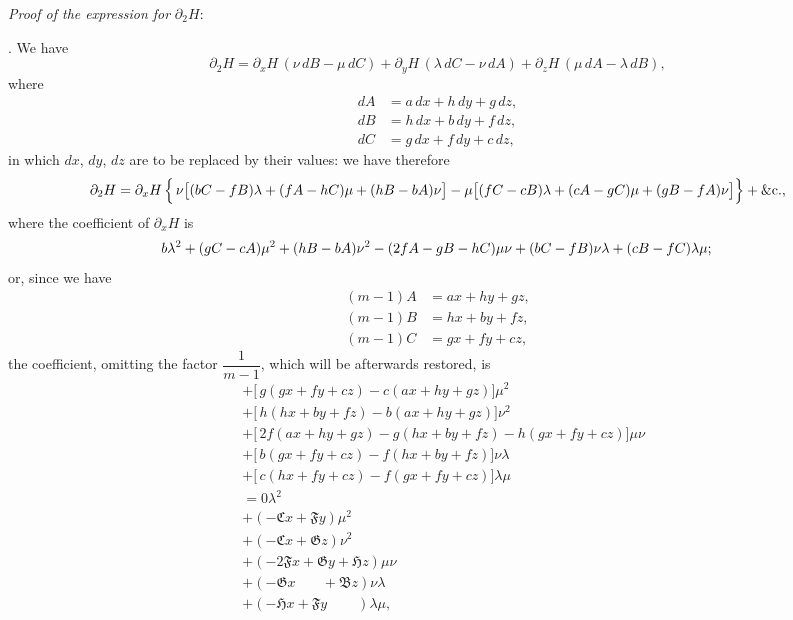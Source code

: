 \documentclass[11pt]{article}
\begin{document}
\medskip

\noindent\textit{Proof of the expression for} $\partial_2 H$:

\medskip

. We have
\[
\partial_2 H = \partial_x H\,(\nu\,dB - \mu\,dC) + \partial_y H\,(\lambda\,dC - \nu\,dA) + \partial_z H\,(\mu\,dA - \lambda\,dB),
\]
where
\[
\begin{aligned}
dA &= a\,dx + h\,dy + g\,dz,\\
dB &= h\,dx + b\,dy + f\,dz,\\
dC &= g\,dx + f\,dy + c\,dz,
\end{aligned}
\]
in which $dx$, $dy$, $dz$ are to be replaced by their values: we have therefore
\[
\partial_2 H = \partial_x H\,\Bigl\{\,\nu\bigl[(bC - fB)\lambda + (fA - hC)\mu + (hB - bA)\nu\bigr] \\
   - \mu\bigl[(fC - cB)\lambda + (cA - gC)\mu + (gB - fA)\nu\bigr]\Bigr\} + \&\text{c.},
\]
where the coefficient of $\partial_x H$ is
\[
\begin{aligned}
&\hphantom{+}b\lambda^2 + (gC - cA)\mu^2 + (hB - bA)\nu^2 - (2fA - gB - hC)\mu\nu + (bC - fB)\nu\lambda + (cB - fC)\lambda\mu;
\end{aligned}
\]
or, since we have
\[
\begin{aligned}
(m-1)A &= ax + hy + gz,\\
(m-1)B &= hx + by + fz,\\
(m-1)C &= gx + fy + cz,
\end{aligned}
\]
the coefficient, omitting the factor $\dfrac{1}{m-1}$, which will be afterwards restored, is
\[
\begin{aligned}
&+\bigl[\,g(gx + fy + cz) - c(ax + hy + gz)\bigr]\mu^2\\
&+\bigl[\,h(hx + by + fz) - b(ax + hy + gz)\bigr]\nu^2\\
&+\bigl[\,2f(ax + hy + gz) - g(hx + by + fz) - h(gx + fy + cz)\bigr]\mu\nu\\
&+\bigl[\,b(gx + fy + cz) - f(hx + by + fz)\bigr]\nu\lambda\\
&+\bigl[\,c(hx + fy + cz) - f(gx + fy + cz)\bigr]\lambda\mu\\[2pt]
&= 0\lambda^2\\
&+ (-\mathfrak{C}x + \mathfrak{F}y)\mu^2\\
&+ (-\mathfrak{C}x + \mathfrak{G}z)\nu^2\\
&+ (-2\mathfrak{F}x + \mathfrak{G}y + \mathfrak{H}z)\mu\nu\\
&+ (-\mathfrak{G}x\phantom{+\mathfrak{F}y} + \mathfrak{B}z)\nu\lambda\\
&+ (-\mathfrak{H}x + \mathfrak{F}y\phantom{+\mathfrak{B}z})\lambda\mu,
\end{aligned}
\]
\end{document}
